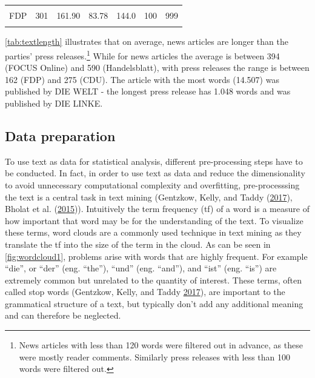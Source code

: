 \documentclass[
]{article}
\begin{document}
\begin{table}[H]
\begin{tabular}[t]{lrrrrrr}
\hspace{1em}\cellcolor{gray!6}{DIE LINKE} & \cellcolor{gray!6}{686} & \cellcolor{gray!6}{200.47} & \cellcolor{gray!6}{71.78} & \cellcolor{gray!6}{190.0} & \cellcolor{gray!6}{101} & \cellcolor{gray!6}{1048}\\
\hspace{1em}FDP & 301 & 161.90 & 83.78 & 144.0 & 100 & 999\\
\hspace{1em}\cellcolor{gray!6}{SPD} & \cellcolor{gray!6}{315} & \cellcolor{gray!6}{213.41} & \cellcolor{gray!6}{56.16} & \cellcolor{gray!6}{208.0} & \cellcolor{gray!6}{103} & \cellcolor{gray!6}{429}\\
\bottomrule
\end{tabular}
\end{table}

\autoref{tab:textlength} illustrates that on average, news articles are
longer than the parties' press releases.\footnote{News articles with
  less than 120 words were filtered out in advance, as these were mostly
  reader comments. Similarly press releases with less than 100 words
  were filtered out.} While for news articles the average is between 394
(FOCUS Online) and 590 (Handelsblatt), with press releases the range is
between 162 (FDP) and 275 (CDU). The article with the most words
(14.507) was published by DIE WELT - the longest press release has 1.048
words and was published by DIE LINKE.

\hypertarget{data-preparation}{%
\subsection{Data preparation}\label{data-preparation}}

To use text as data for statistical analysis, different pre-processing
steps have to be conducted. In fact, in order to use text as data and
reduce the dimensionality to avoid unnecessary computational complexity
and overfitting, pre-processsing the text is a central task in text
mining (Gentzkow, Kelly, and Taddy
(\protect\hyperlink{ref-gentzkow_text_2017}{2017}), Bholat et al.
(\protect\hyperlink{ref-bholat_text_2015}{2015})). Intuitively the term
frequency (tf) of a word is a measure of how important that word may be
for the understanding of the text. To visualize these terms, word clouds
are a commonly used technique in text mining as they translate the tf
into the size of the term in the cloud. As can be seen in
\autoref{fig:wordcloud1}, problems arise with words that are highly
frequent. For example ``die'', or ``der'' (eng. ``the''), ``und'' (eng.
``and''), and ``ist'' (eng. ``is'') are extremely common but unrelated
to the quantity of interest. These terms, often called stop words
(Gentzkow, Kelly, and Taddy
\protect\hyperlink{ref-gentzkow_text_2017}{2017}), are important to the
grammatical structure of a text, but typically don't add any additional
meaning and can therefore be neglected.
\end{document}
